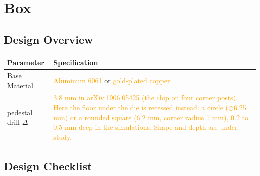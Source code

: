 \section{Box}

\subsection*{Design Overview}
\begin{table}[h!]
\centering
\begin{tabular}{l|p{}}
\toprule
\textbf{Parameter} & \textbf{Specification} \\ \bottomrule
Base Material & \textcolor{orange}{Aluminum 6061} or \textcolor{orange}{gold-plated copper} \footnotemark \\
pedestal drill $\Delta$ & \textcolor{orange}{3.8 mm in arXiv:1906.05425 (the chip on four corner posts). Here the floor under the die is recessed instead: a circle ($\varnothing$6.25 mm) or a rounded square (6.2 mm, corner radius 1 mm), 0.2 to 0.5 mm deep in the simulations. Shape and depth are under study.} \\
\bottomrule
\end{tabular}
\end{table}

\subsection*{Design Checklist}

